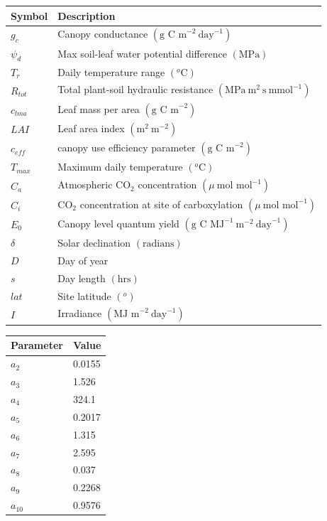 \begin{center}
\begin{tabular}{| l | l |}
\hline
Symbol & Description \\ \hline
$g_c$ & Canopy conductance $(\text{g C m}^{-2}~\text{day}^{-1})$ \\ \hline
$\psi_d$ & Max soil-leaf water potential difference $(\text{MPa})$ \\ \hline
$T_r$ & Daily temperature range $( ^{o}\text{C})$ \\ \hline
$R_{tot}$ & Total plant-soil hydraulic resistance $(\text{MPa}~\text{m}^2~\text{s}~\text{mmol}^{-1})$ \\ \hline
$c_{lma}$ & Leaf mass per area $(\text{g C m}^{-2})$  \\ \hline
$LAI$ & Leaf area index $(\text{m}^2~\text{m}^{-2})$ \\ \hline
$c_{eff}$ &canopy use efficiency parameter $(\text{g C m}^{-2})$  \\ \hline
$T_{max}$ & Maximum daily temperature $( ^{o}\text{C})$  \\ \hline
$C_a$ & Atmospheric CO$_2$ concentration $(\mu~\text{mol mol}^{-1})$ \\ \hline
$C_i$ & CO$_2$ concentration at site of carboxylation $(\mu~\text{mol mol}^{-1})$ \\ \hline
$E_0$ & Canopy level quantum yield $(\text{g C MJ}^{-1}~\text{m}^{-2}~\text{day}^{-1})$ \\ \hline
$\delta$ & Solar declination $(\text{radians})$ \\ \hline
$D$ & Day of year \\ \hline
$s$ & Day length $(\text{hrs})$ \\  \hline  
$lat$ & Site latitude $( ^{o})$ \\ \hline
$I$ & Irradiance $(\text{MJ m}^{-2}~\text{day}^{-1})$ \\ 
\hline
\end{tabular}    
 \label{chap5:table:acm}
\end{center}

\begin{center}
\begin{tabular}{| l | l |}
\hline
Parameter & Value \\ \hline
$a_2$ & 0.0155 \\ \hline
$a_3$ & 1.526 \\ \hline
$a_4$ & 324.1 \\ \hline
$a_5$ & 0.2017 \\ \hline
$a_6$ & 1.315 \\ \hline
$a_7$ & 2.595 \\ \hline
$a_8$ & 0.037 \\ \hline
$a_9$ & 0.2268 \\ \hline
$a_{10}$ & 0.9576 \\
\hline
\end{tabular}    
 \label{chap5:table:acm_params}
\end{center}

